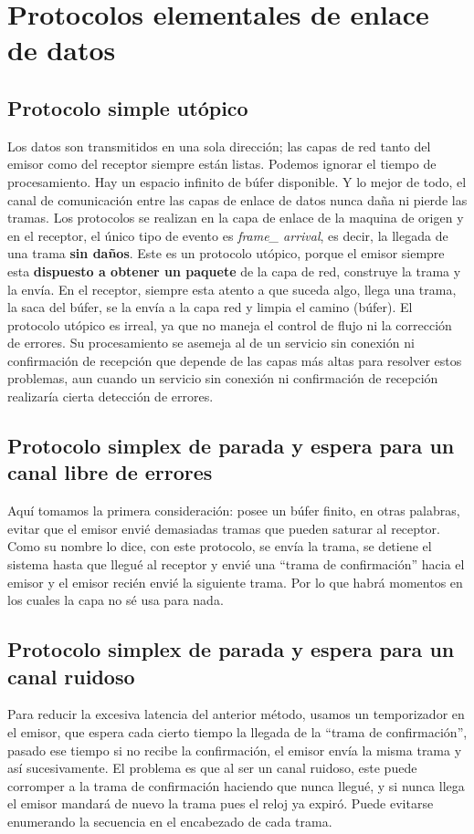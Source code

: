 \documentclass[
	12pt, %
	fleqn, %
	a4paper, %
	oneside, %
]{LegrandOrangeBook}
\begin{document}
\section{Protocolos elementales de enlace de datos}
\subsection{Protocolo simple utópico}
Los datos son transmitidos en una sola dirección; las capas de red tanto del emisor como del receptor siempre están listas. Podemos ignorar el tiempo de procesamiento. Hay un espacio infinito de búfer disponible. Y lo mejor de todo, el canal de comunicación entre las capas de enlace de datos nunca daña ni pierde las tramas. Los protocolos se realizan en la capa de enlace de la maquina de origen y en el receptor, el único tipo de evento es \textit{frame\_ arrival}, es decir, la llegada de una trama \textbf{sin daños}. Este es un protocolo utópico, porque el emisor siempre esta \textbf{dispuesto a obtener un paquete} de la capa de red, construye la trama y la envía. En el receptor, siempre esta atento a que suceda algo, llega una trama, la saca del búfer, se la envía  a la capa red y limpia el camino (búfer). El protocolo utópico es irreal, ya que no maneja el control de flujo ni la corrección de errores. Su procesamiento se asemeja al de un servicio sin conexión ni confirmación de recepción que depende de las capas más altas para resolver estos problemas, aun cuando un servicio sin conexión ni confirmación de recepción realizaría cierta detección de errores.
\subsection{Protocolo simplex de parada y espera para un canal libre de errores}
Aquí tomamos la primera consideración: posee un búfer finito, en otras palabras, evitar que el emisor envié demasiadas tramas que pueden saturar al receptor. Como su nombre lo dice, con este protocolo, se envía la trama, se detiene el sistema hasta que llegué al receptor y envié una ``trama de confirmación'' hacia el emisor y el emisor recién envié la siguiente trama. Por lo que habrá momentos en los cuales la capa no sé usa para nada.
\subsection{Protocolo simplex de parada y espera para un canal ruidoso}
Para reducir la excesiva latencia del anterior método, usamos un temporizador en el emisor, que espera cada cierto tiempo la llegada de la ``trama de confirmación'', pasado ese tiempo si no recibe la confirmación, el emisor envía la misma trama y así sucesivamente. El problema es que al ser un canal ruidoso, este puede corromper a la trama de confirmación haciendo que nunca llegué, y si nunca llega el emisor mandará de nuevo la trama pues el reloj ya expiró. Puede evitarse enumerando la secuencia en el encabezado de cada trama.
\end{document}

